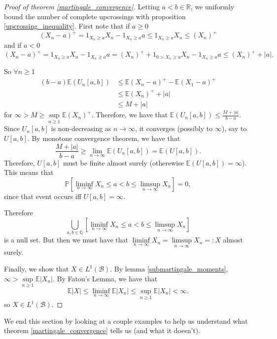 \begin{proof}[Proof of theorem \ref{martingale_convergence}]
    Letting $a < b \in \mathbb{R}$, we uniformly bound the number of complete upcrossings with proposition \ref{upcrossing_inequality}. First note that if $a \geq 0$ 
    $$(X_{n} - a)^{+} = 1_{X_{n} \geq a}X_{n} -1_{X_{n} \geq a}a \leq 1_{X_{n} \geq a}X_{n} \leq (X_{n})^{+}$$
    and if $a < 0$
    $$(X_{n} - a)^{+} = 1_{X_{n} \geq a}X_{n} -1_{X_{n} \geq a}a = (X_{n})^{+} + 1_{0 > X_{n} \geq a}X_{n} -1_{X_{n} \geq a}a \leq (X_{n})^{+} + |a|.$$

    So $\forall n \geq 1$
    \begin{align*}
        (b - a) \mathbb{E}(U_{n}[a, b]) &\leq \mathbb{E}(X_{n} - a)^{+} - \mathbb{E}(X_{1} - a)^{+}\\
        &\leq \mathbb{E}(X_{n})^{+} + |a|\\
        &\leq M + |a|
    \end{align*}
    for $\infty > M \geq \sup\limits_{n \geq 1} \mathbb{E}(X_{n})^{+}$. Therefore, we have that $\mathbb{E}(U_{n}[a,b]) \leq \frac{M + |a|}{b-a}$. Since $U_{n}[a,b]$ is non-decreasing as $n \to \infty$, it converges (possibly to $\infty$), say to $U[a,b]$. By monotone convergence theorem, we have that 
    $$\frac{M + |a|}{b-a} \geq \lim\limits_{n \to \infty} \mathbb{E}(U_{n}[a,b]) = \mathbb{E}(U[a,b]).$$
    Therefore, $U[a,b]$ must be finite almost surely (otherewise $\mathbb{E}(U[a,b]) = \infty$). This means that
    $$\mathbb{P}[\liminf\limits_{n \to \infty} X_{n} \leq a < b \leq \limsup\limits_{n \to \infty} X_{n}] = 0,$$
    since that event occurs iff $U[a,b] = \infty$.

    Therefore
    $$\bigcup\limits_{a, b \in \mathbb{Q}} [\liminf\limits_{n \to \infty} X_{n} \leq a < b \leq \limsup\limits_{n \to \infty} X_{n}]$$
    is a null set. But then we must have that $\liminf\limits_{n \to \infty} X_{n} = \limsup\limits_{n \to \infty} X_{n} =: X$ almost surely.

    Finally, we show that $X \in L^{1}(\mathcal{B})$. By lemma \ref{submartingale_moments}, $\infty > \sup\limits_{n \geq 1} \mathbb{E}|X_{n}|$. By Fatou's Lemma, we have that
    $$\mathbb{E}|X| \leq \liminf\limits_{n \to \infty} \mathbb{E}|X_{n}| \leq \sup\limits_{n \geq 1} \mathbb{E}|X_{n}| < \infty.$$
    so $X \in L^{1}(\mathcal{B})$.
\end{proof}

We end this section by looking at a couple examples to help us understand what theorem \ref{martingale_convergence} tells us (and what it doesn't).

